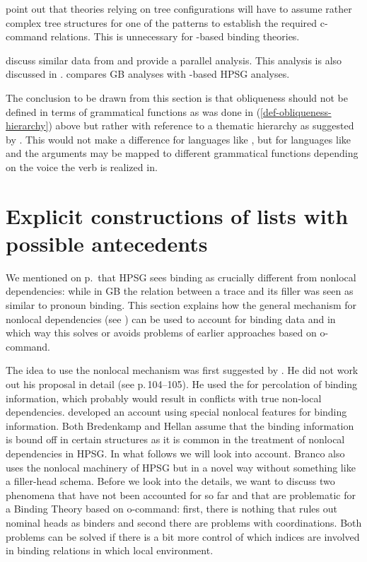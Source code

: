 \documentclass[output=paper
 	        ,biblatex
                ,babelshorthands
                ,newtxmath
                ,draftmode
                ,colorlinks, citecolor=brown
]{langscibook}
\begin{document}
\citet[]{MS98a} point out that theories relying on tree configurations will have to assume
rather complex tree structures for one of the patterns to establish the required c-command
relations. This is unnecessary for \argst-based binding theories.

\citet{WA98a-u} discuss similar data from  and provide a parallel analysis. This
analysis is also discussed in . 
\citet{Wechsler99a-u} compares GB analyses with \argst-based HPSG analyses.

The conclusion to be drawn from this section is that obliqueness should not be defined in terms of
grammatical functions as was done in (\ref{def-obliqueness-hierarchy}) above but rather with
reference to a thematic hierarchy as suggested by \citet{Jackendoff72a-u}.
This would not make a difference for languages like , but for languages like
 and  the arguments may be mapped to different grammatical functions
depending on the voice the verb is realized in.





\section{Explicit constructions of lists with possible antecedents}
\label{sec-bt-nonlocal}

We mentioned on p.\,\pageref{page-traces-binding} that HPSG sees binding as crucially different from nonlocal
dependencies: while in GB the relation between a trace and its filler was seen as similar to pronoun
binding. This section explains how the general mechanism for nonlocal dependencies (see
) can be used to account for binding data and in which way this solves or
avoids problems of earlier approaches based on o-command. 

The idea to use the nonlocal mechanism was first suggested by
\citet[Section~7.2.3]{Bredenkamp96a}. He did not work out his proposal in detail (see 
p.\,104--105). He used the \slashf for percolation of binding information, which probably would
result in conflicts with true non-local dependencies. \citet{Hellan2005a} developed an account using
special nonlocal features for binding information. Both Bredenkamp and Hellan assume that the
binding information is bound off in certain structures as it is common in the treatment of nonlocal
dependencies in HPSG. In what follows we will look into  account. Branco also
uses the nonlocal machinery of HPSG but in a novel way without something like a filler-head
schema. Before we look into the details, we want to discuss two phenomena that have not been
accounted for so far and that are problematic for a Binding Theory based on o-command: first, there
is nothing that rules out nominal heads as binders and second there are problems with
coordinations. Both problems can be solved if there is a bit more control of which indices are
involved in binding relations in which local environment.
\end{document}
